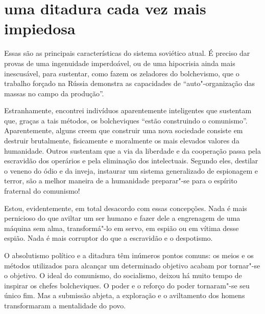 \section*{uma ditadura cada vez mais impiedosa}
Essas são as principais características do sistema soviético atual. É
preciso dar provas de uma ingenuidade imperdoável, ou de uma hipocrisia
ainda mais inescusável, para sustentar, como fazem os zeladores do
bolchevismo, que o trabalho forçado na Rússia demonstra as capacidades
de “auto"-organização das massas no campo da produção”.

Estranhamente, encontrei indivíduos aparentemente inteligentes que
sustentam que, graças a tais métodos, os bolcheviques “estão
construindo o comunismo”. Aparentemente, alguns creem que construir uma
nova sociedade consiste em destruir brutalmente, fisicamente e moralmente os mais
elevados valores da humanidade. Outros sustentam que a via da liberdade
e da cooperação passa pela escravidão dos operários e pela eliminação
dos intelectuais. Segundo eles, destilar o veneno do ódio e da inveja,
instaurar um sistema generalizado de espionagem e terror, são a
melhor maneira de a humanidade preparar"-se para o espírito
fraternal do comunismo!

Estou, evidentemente, em total desacordo com essas concepções. Nada é
mais pernicioso do que aviltar um ser humano e fazer dele a engrenagem
de uma máquina sem alma, transformá"-lo em servo, em espião ou em
vítima desse espião. Nada é mais corruptor do que a escravidão e o
despotismo.

O absolutismo político e a ditadura têm inúmeros pontos comuns: os meios
e os métodos utilizados para alcançar um determinado objetivo acabam
por tornar"-se o objetivo. O ideal do comunismo, do socialismo, deixou
há muito tempo de inspirar os chefes bolcheviques. O poder e o reforço
do poder tornaram"-se seu único fim. Mas a submissão abjeta, a
exploração e o aviltamento dos homens transformaram a mentalidade do
povo.

